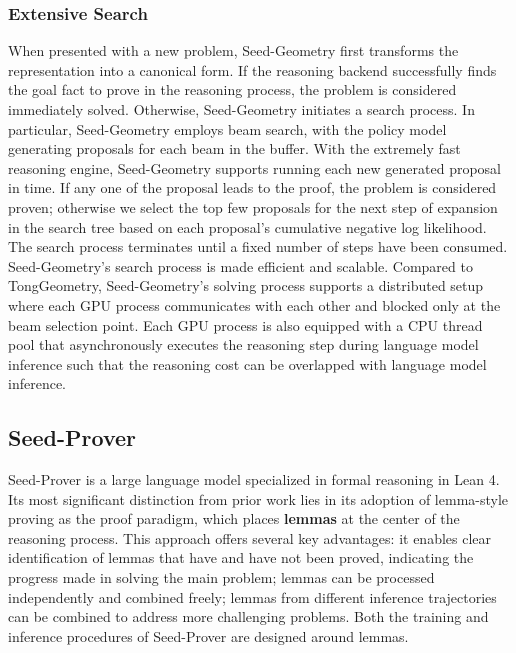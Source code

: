 \subsubsection{Extensive Search}
When presented with a new problem, Seed-Geometry first transforms the representation into a canonical form. If the reasoning backend successfully finds the goal fact to prove in the reasoning process, the problem is considered immediately solved. Otherwise, Seed-Geometry initiates a search process. In particular, Seed-Geometry employs beam search, with the policy model generating proposals for each beam in the buffer. With the extremely fast reasoning engine, Seed-Geometry supports running each new generated proposal in time. If any one of the proposal leads to the proof, the problem is considered proven; otherwise we select the top few proposals for the next step of expansion in the search tree based on each proposal's cumulative negative log likelihood. The search process terminates until a fixed number of steps have been consumed. Seed-Geometry's search process is made efficient and scalable. Compared to TongGeometry, Seed-Geometry's solving process supports a distributed setup where each GPU process communicates with each other and blocked only at the beam selection point. Each GPU process is also equipped with a CPU thread pool that asynchronously executes the reasoning step during language model inference such that the reasoning cost can be overlapped with language model inference. %

\subsection{Seed-Prover}
Seed-Prover is a large language model specialized in formal reasoning in Lean 4. Its most significant distinction from prior work lies in its adoption of lemma-style proving as the proof paradigm, which places \textbf{lemmas} at the center of the reasoning process. This approach offers several key advantages: it enables clear identification of lemmas that have and have not been proved, indicating the progress made in solving the main problem; lemmas can be processed independently and combined freely; lemmas from different inference trajectories can be combined to address more challenging problems. Both the training and inference procedures of Seed-Prover are designed around lemmas.

